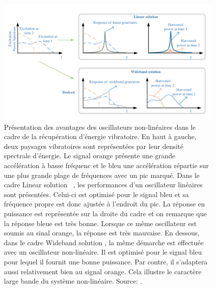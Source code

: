 \documentclass[a4paper, french, 12pt, titlepage]{article}
\begin{document}
\begin{figure}
  \begin{center}
    \includegraphics[width = .8\textwidth]{images/weiqun_lui_harvester2}
  \end{center}
  \caption{Présentation des avantages des oscillateurs non-linéaires dans le cadre de la récupération d'énergie vibratoire.
    En haut à gauche, deux paysages vibratoires sont représentées par leur densité spectrale d'énergie.
    Le signal orange présente une grande accélération à basse fréquenc et le bleu une accélération répartie sur une plus grande plage de fréquences avec un pic marqué.
    Dans le cadre \og Linear solution \og~, les performances d'un oscillateur linéaires sont présentées.
    Celui-ci est optimisé pour le signal bleu et sa fréquence propre est donc ajustée à l'endroit du pic.
    La réponse en puissance est représentée sur la droite du cadre et on remarque que la réponse bleue est très bonne.
    Lorsque ce même oscillateur est soumis au sinal orange, la réponse est très mauvaise.
    En dessous, dans le cadre \og Wideband solution \fg, la même démarche est effectuée avec un oscillateur non-linéaire.
    Il est optimisé pour le signal bleu pour lequel il fournit une bonne puissance.
    Par contre, il s'adaptera aussi relativement bien au signal orange.
    Cela illustre le caractère large bande du système non-linéaire.  Source:  \cite{Liu2014}.}
  \label{fig:wl_wideband}
\end{figure}
\end{document}

